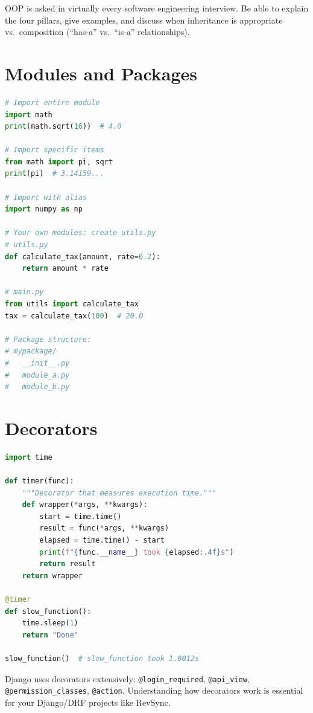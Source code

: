 \documentclass[12pt, a4paper, oneside]{book}
\begin{document}
\begin{interviewbox}
OOP is asked in virtually every software engineering interview. Be able to explain the four pillars, give examples, and discuss when inheritance is appropriate vs.\ composition (``has-a'' vs.\ ``is-a'' relationships).
\end{interviewbox}

\section{Modules and Packages}

\begin{lstlisting}[language=Python, caption={Modules and imports}]
# Import entire module
import math
print(math.sqrt(16))  # 4.0

# Import specific items
from math import pi, sqrt
print(pi)  # 3.14159...

# Import with alias
import numpy as np

# Your own modules: create utils.py
# utils.py
def calculate_tax(amount, rate=0.2):
    return amount * rate

# main.py
from utils import calculate_tax
tax = calculate_tax(100)  # 20.0

# Package structure:
# mypackage/
#   __init__.py
#   module_a.py
#   module_b.py
\end{lstlisting}

\section{Decorators}

\begin{lstlisting}[language=Python, caption={Decorators}]
import time

def timer(func):
    """Decorator that measures execution time."""
    def wrapper(*args, **kwargs):
        start = time.time()
        result = func(*args, **kwargs)
        elapsed = time.time() - start
        print(f"{func.__name__} took {elapsed:.4f}s")
        return result
    return wrapper

@timer
def slow_function():
    time.sleep(1)
    return "Done"

slow_function()  # slow_function took 1.0012s
\end{lstlisting}

\begin{projectbox}
Django uses decorators extensively: \texttt{@login\_required}, \texttt{@api\_view}, \texttt{@permission\_classes}, \texttt{@action}. Understanding how decorators work is essential for your Django/DRF projects like RevSync.
\end{projectbox}
\end{document}
